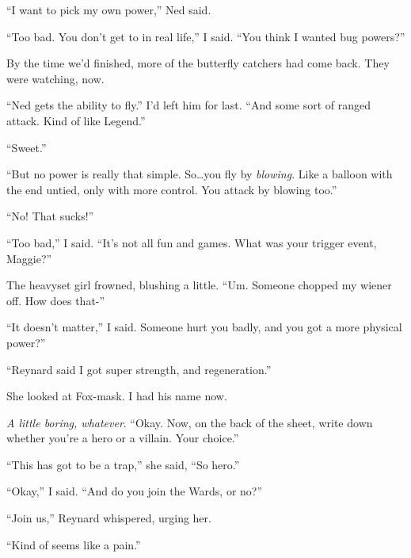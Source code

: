 ``I want to pick my own power,'' Ned said.



``Too bad.  You don't get to in real life,'' I said.  ``You think I wanted bug powers?''



By the time we'd finished, more of the butterfly catchers had come back.  They were watching, now.



``Ned gets the ability to fly.''  I'd left him for last. ``And some sort of ranged attack.  Kind of like Legend.''



``Sweet.''



``But no power is really that simple.  So\ldots you fly by \emph{blowing}.  Like a balloon with the end untied, only with more control.  You attack by blowing too.''



``No!  That sucks!''



``Too bad,'' I said.  ``It's not all fun and games.  What was your trigger event, Maggie?''



The heavyset girl frowned, blushing a little.  ``Um.  Someone chopped my wiener off.  How does that-''



``It doesn't matter,'' I said.  Someone hurt you badly, and you got a more physical power?''



``Reynard said I got super strength, and regeneration.''



She looked at Fox-mask.  I had his name now.



\emph{A little boring, whatever}.  ``Okay.  Now, on the back of the sheet, write down whether you're a hero or a villain.  Your choice.''



``This has got to be a trap,'' she said, ``So hero.''



``Okay,'' I said.  ``And do you join the Wards, or no?''



``Join us,'' Reynard whispered, urging her.



``Kind of seems like a pain.''



